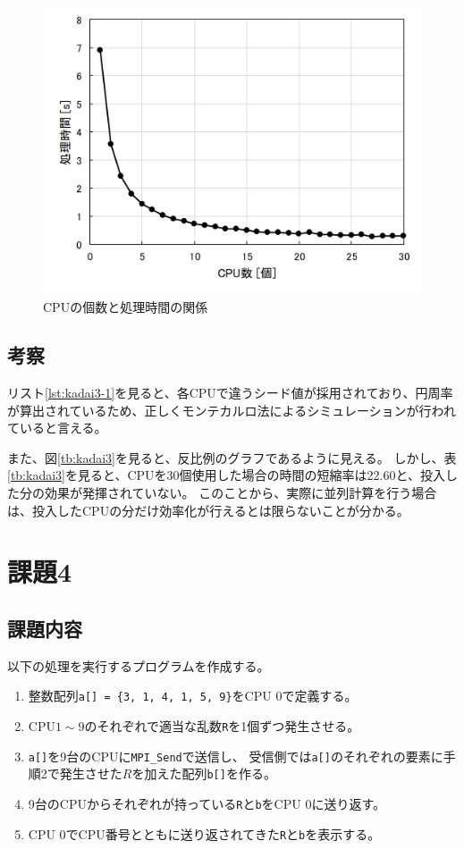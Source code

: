 \documentclass[a4j,titlepage]{jsarticle}
\begin{document}
\begin{figure}[H]
  \centering
  \includegraphics[width=12cm]{./MPI/kadai03-result/kadai03.png}
  \caption{CPUの個数と処理時間の関係}
  \label{fig:kadai3}
\end{figure}

\subsection{考察}
リスト\ref{lst:kadai3-1}を見ると、各CPUで違うシード値が採用されており、円周率が算出されているため、正しくモンテカルロ法によるシミュレーションが行われていると言える。

また、図\ref{tb:kadai3}を見ると、反比例のグラフであるように見える。
しかし、表\ref{tb:kadai3}を見ると、CPUを30個使用した場合の時間の短縮率は22.60と、投入した分の効果が発揮されていない。
このことから、実際に並列計算を行う場合は、投入したCPUの分だけ効率化が行えるとは限らないことが分かる。


\section{課題4}
\subsection{課題内容}
以下の処理を実行するプログラムを作成する。

\begin{enumerate}
  \item 整数配列\texttt{a[] = \{3, 1, 4, 1, 5, 9\}}をCPU 0で定義する。
  \item CPU$1 \sim 9$のそれぞれで適当な乱数\texttt{R}を1個ずつ発生させる。
  \item \texttt{a[]}を9台のCPUに\texttt{MPI\_Send}で送信し、
        受信側では\texttt{a[]}のそれぞれの要素に手順2で発生させた$R$を加えた配列\texttt{b[]}を作る。
  \item 9台のCPUからそれぞれが持っている\texttt{R}と\texttt{b}をCPU 0に送り返す。
  \item CPU 0でCPU番号とともに送り返されてきた\texttt{R}と\texttt{b}を表示する。
\end{enumerate}
\end{document}
